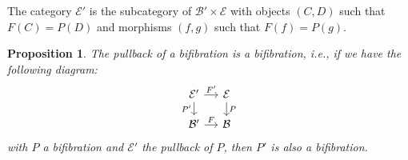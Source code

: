\documentclass[12pt,reqno]{amsart}
\newtheorem{prop}[teo]{Proposition}
\theoremstyle{definition}
\theoremstyle{remark}
\numberwithin{figure}{section}%
\newcommand{\Ba}{\mathcal{B}}
\newcommand{\E}{\mathcal{E}}
\begin{document}
  The category $\E'$ is the subcategory of $\Ba' \times \E$ with objects $(C,D)$ such that $F(C)=P(D)$ and morphisms $(f,g)$ such that $F(f)=P(g)$. 




\begin{prop}
    The pullback of a bifibration is a bifibration, i.e., if we have the following diagram:
    $$
\begin{tikzcd}[column sep=12pt, row sep=12pt] 
\E' \arrow[d, "P'"'] \arrow[r, "F'"] & \E \arrow[d, "P"] \\
\Ba' \arrow[r, "F"]                  & \Ba               
\end{tikzcd}
    $$
    with $P$ a bifibration and $\E'$ the pullback of $P$, then $P'$ is also a bifibration.
\end{prop}
\end{document}
